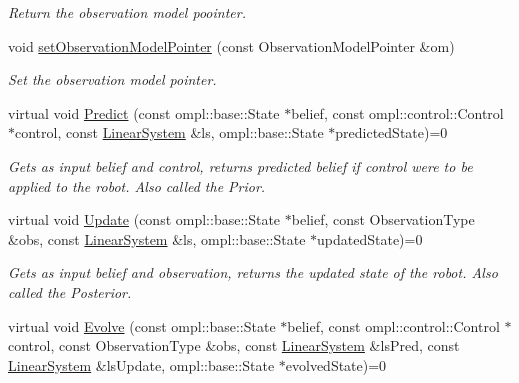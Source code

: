 \begin{DoxyCompactItemize}
\begin{DoxyCompactList}\small\item\em \-Return the observation model poointer. \end{DoxyCompactList}\item 
\hypertarget{class_kalman_filter_method_a4b966a487acbbdda0f145be9a1da03d5}{void \hyperlink{class_kalman_filter_method_a4b966a487acbbdda0f145be9a1da03d5}{set\-Observation\-Model\-Pointer} (const \-Observation\-Model\-Pointer \&om)}\label{class_kalman_filter_method_a4b966a487acbbdda0f145be9a1da03d5}

\begin{DoxyCompactList}\small\item\em \-Set the observation model pointer. \end{DoxyCompactList}\item 
\hypertarget{class_kalman_filter_method_a60d4e0a2eb06676f48727e21d33eb31f}{virtual void \hyperlink{class_kalman_filter_method_a60d4e0a2eb06676f48727e21d33eb31f}{\-Predict} (const ompl\-::base\-::\-State $\ast$belief, const ompl\-::control\-::\-Control $\ast$control, const \hyperlink{class_linear_system}{\-Linear\-System} \&ls, ompl\-::base\-::\-State $\ast$predicted\-State)=0}\label{class_kalman_filter_method_a60d4e0a2eb06676f48727e21d33eb31f}

\begin{DoxyCompactList}\small\item\em \-Gets as input belief and control, returns predicted belief if control were to be applied to the robot. \-Also called the \-Prior. \end{DoxyCompactList}\item 
\hypertarget{class_kalman_filter_method_af79c09c56a2f81c1af8896f235d37afd}{virtual void \hyperlink{class_kalman_filter_method_af79c09c56a2f81c1af8896f235d37afd}{\-Update} (const ompl\-::base\-::\-State $\ast$belief, const \-Observation\-Type \&obs, const \hyperlink{class_linear_system}{\-Linear\-System} \&ls, ompl\-::base\-::\-State $\ast$updated\-State)=0}\label{class_kalman_filter_method_af79c09c56a2f81c1af8896f235d37afd}

\begin{DoxyCompactList}\small\item\em \-Gets as input belief and observation, returns the updated state of the robot. \-Also called the \-Posterior. \end{DoxyCompactList}\item 
\hypertarget{class_kalman_filter_method_a9e56fcd80484eb15d50597b528bc6da9}{virtual void \hyperlink{class_kalman_filter_method_a9e56fcd80484eb15d50597b528bc6da9}{\-Evolve} (const ompl\-::base\-::\-State $\ast$belief, const ompl\-::control\-::\-Control $\ast$control, const \-Observation\-Type \&obs, const \hyperlink{class_linear_system}{\-Linear\-System} \&ls\-Pred, const \hyperlink{class_linear_system}{\-Linear\-System} \&ls\-Update, ompl\-::base\-::\-State $\ast$evolved\-State)=0}\label{class_kalman_filter_method_a9e56fcd80484eb15d50597b528bc6da9}


\end{DoxyCompactItemize}

